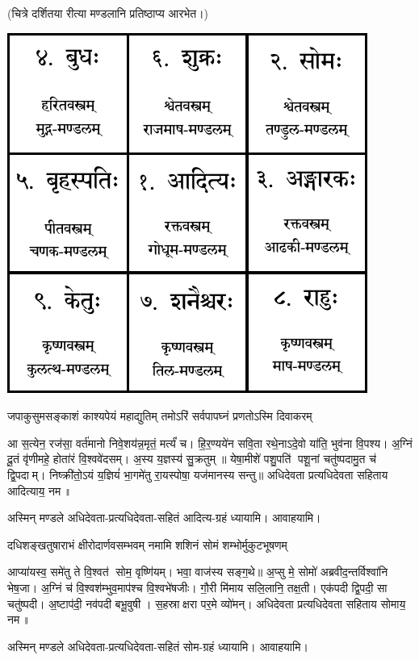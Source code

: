 
(चित्रे दर्शितया रीत्या मण्डलानि प्रतिष्ठाप्य आरभेत।)

\centerline{\includegraphics{purvanga/navagraha-diagram.pdf}}

\twolineshloka
{जपाकुसुमसङ्काशं काश्यपेयं महाद्युतिम्}
{तमोऽरिं सर्वपापघ्नं प्रणतोऽस्मि दिवाकरम्}

आ स॒त्येन॒ रज॑सा॒ वर्त॑मानो निवे॒शय॑न्न॒मृतं॒ मर्त्यं॑ च। हि॒र॒ण्यये॑न सवि॒ता रथे॒नाऽदे॒वो या॑ति॒
भुव॑ना वि॒पश्य\sn{}। अ॒ग्निं दू॒तं वृ॑णीमहे॒ होता॑रं वि॒श्ववे॑दसम्। अ॒स्य य॒ज्ञस्य॑ सु॒क्रतुम्॥
येषा॒मीशे॑ पशु॒पति॑ पशू॒नां चतु॑ष्पदामु॒त च॑ द्वि॒पदाम्। निष्क्री॑तो॒ऽयं य॒ज्ञियं॑ भा॒गमे॑तु
रा॒यस्पोषा॒ यज॑मानस्य सन्तु॥  अधिदेवता प्रत्यधिदेवता सहिताय आदित्याय॒ नम॥ 

अस्मिन् मण्डले अधिदेवता-प्रत्यधिदेवता-सहितं आदित्य-ग्रहं ध्यायामि। आवाहयामि।

\twolineshloka
{दधिशङ्खतुषाराभं क्षीरोदार्णवसम्भवम्}
{नमामि शशिनं सोमं शम्भोर्मुकुटभूषणम्}

आप्या॑यस्व॒ समे॑तु ते वि॒श्वत॑ सोम॒ वृष्णि॑यम्। भवा॒ वाज॑स्य सङ्ग॒थे॥ अ॒प्सु मे॒ सोमो॑
अब्रवीद॒न्तर्विश्वा॑नि भेष॒जा। अ॒ग्निं च॑ वि॒श्वश॑म्भुव॒माप॑श्च वि॒श्वभे॑षजीः। गौ॒री मि॑माय
सलि॒लानि॒ तक्ष॒ती। एक॑पदी द्वि॒पदी॒ सा चतु॑ष्पदी। अ॒ष्टाप॑दी॒ नव॑पदी बभू॒वुषी। स॒हस्राक्षरा पर॒मे
व्यो॑मन्।  अधिदेवता प्रत्यधिदेवता सहिताय सोमाय॒ नम॥ 

अस्मिन् मण्डले अधिदेवता-प्रत्यधिदेवता-सहितं सोम-ग्रहं ध्यायामि। आवाहयामि।


